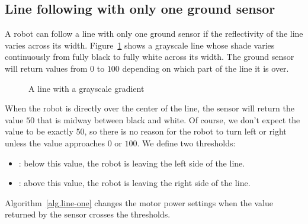 \subsection{Line following with only one ground sensor}

A robot can follow a line with only one ground sensor if the reflectivity of the line varies across its width. Figure~\ref{fig.gradient} shows a grayscale line whose shade varies continuously from fully black to fully white across its width. The ground sensor will return values from $0$ to $100$ depending on which part of the line it is over.

\begin{figure}
\begin{center}
\caption{A line with a grayscale gradient}\label{fig.gradient}
\end{center}
\end{figure}

When the robot is directly over the center of the line, the sensor will return the value $50$ that is midway between black and white. Of course, we don't expect the value to be exactly 50, so there is no reason for the robot to turn left or right unless the value approaches $0$ or $100$. We define two thresholds:
\begin{itemize}
\item {}: below this value, the robot is leaving the left side of the line.
\item {}: above this value, the robot is leaving the right side of the line.
\end{itemize}
Algorithm~\ref{alg.line-one} changes the motor power settings when the value returned by the sensor crosses the thresholds.

